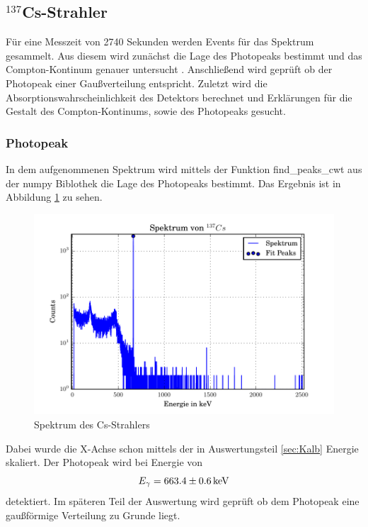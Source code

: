 \subsection{$^{137}$Cs-Strahler}
Für eine Messzeit von 2740 Sekunden werden Events für das Spektrum gesammelt. Aus diesem wird zunächst die Lage des Photopeaks bestimmt und das Compton-Kontinum genauer untersucht . Anschließend wird geprüft ob der Photopeak einer Gaußverteilung entspricht. Zuletzt wird die Absorptionswahrscheinlichkeit des Detektors berechnet und Erklärungen für die Gestalt des Compton-Kontinums, sowie des Photopeaks gesucht.


\subsubsection{Photopeak}
In dem aufgenommenen Spektrum wird mittels der Funktion find\_peaks\_cwt aus der numpy Biblothek die Lage des Photopeaks bestimmt. Das Ergebnis ist in Abbildung \ref{fig:SpekCS} zu sehen.
\begin{figure}
  \centering
  \includegraphics[width=\textwidth]{./build/SpektCS.pdf}
  \caption{Spektrum des Cs-Strahlers}
  \label{fig:SpekCS}
\end{figure}

Dabei wurde die X-Achse schon mittels der in Auswertungsteil \ref{sec:Kalb} Energie skaliert. Der Photopeak wird bei Energie von
\begin{equation}
  E_\gamma = \num{663.4 +- 0.6} \, \text{keV}
  \label{eqn:CsPhoto}
\end{equation}
detektiert. Im späteren Teil der Auswertung wird geprüft ob dem Photopeak eine gaußförmige Verteilung zu Grunde liegt.


